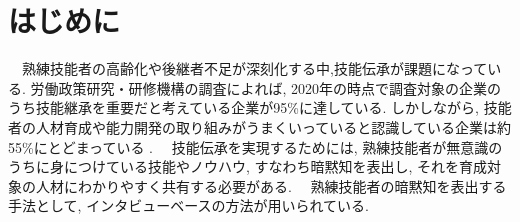\chapter{はじめに}
　熟練技能者の高齢化や後継者不足が深刻化する中,技能伝承が課題になっている. 労働政策研究・研修機構の調査によれば, 2020年の時点で調査対象の企業のうち技能継承を重要だと考えている企業が95\%に達している. しかしながら, 技能者の人材育成や能力開発の取り組みがうまくいっていると認識している企業は約55\%にとどまっている \cite{JILPT2020}. 
　技能伝承を実現するためには, 熟練技能者が無意識のうちに身につけている技能やノウハウ, すなわち暗黙知を表出し, それを育成対象の人材にわかりやすく共有する必要がある.
　熟練技能者の暗黙知を表出する手法として, インタビューベースの方法が用いられている\cite{Onozato1998, Yashiro2021,Ogawa2011}. 